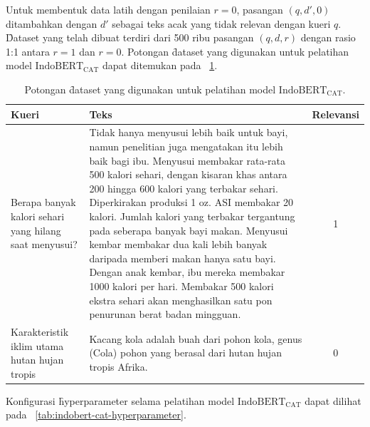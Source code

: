 Untuk membentuk data latih dengan penilaian $r=0$, pasangan $(q, d',0)$ ditambahkan dengan $d'$ sebagai teks acak yang tidak relevan dengan kueri $q$. \f{Dataset} yang telah dibuat terdiri dari 500 ribu pasangan $(q, d, r)$ dengan rasio 1:1 antara $r=1$ dan $r=0$. Potongan \f{dataset} yang digunakan untuk pelatihan model $\text{IndoBERT}_{\text{CAT}}$ dapat ditemukan pada \tab~\ref{tab:contoh-indobert-cat-data}.
\begin{table}[!ht]
    \centering
    \caption{Potongan \f{dataset} yang digunakan untuk pelatihan model $\text{IndoBERT}_{\text{CAT}}$.}
    \label{tab:contoh-indobert-cat-data}
    \begin{tabular}{|p{3cm}|p{10cm}|c|} \hline
        \textbf{Kueri}                                         & \textbf{Teks}                                                                                                                                                                                                                                                                                                                                                                                                                                                                                                                                                                                          & \textbf{Relevansi} \\ \hline
        Berapa banyak kalori sehari yang hilang saat menyusui? & Tidak hanya menyusui lebih baik untuk bayi, namun penelitian juga mengatakan itu lebih baik bagi ibu. Menyusui membakar rata-rata 500 kalori sehari, dengan kisaran khas antara 200 hingga 600 kalori yang terbakar sehari. Diperkirakan produksi 1 oz. ASI membakar 20 kalori. Jumlah kalori yang terbakar tergantung pada seberapa banyak bayi makan. Menyusui kembar membakar dua kali lebih banyak daripada memberi makan hanya satu bayi. Dengan anak kembar, ibu mereka membakar 1000 kalori per hari. Membakar 500 kalori ekstra sehari akan menghasilkan satu pon penurunan berat badan mingguan. & 1                  \\ \hline
        Karakteristik iklim utama hutan hujan tropis           & Kacang kola adalah buah dari pohon kola, genus (Cola) pohon yang berasal dari hutan hujan tropis Afrika. & 0                  \\ \hline
    \end{tabular}
\end{table}

Konfigurasi \f{hyperparameter} selama pelatihan model $\text{IndoBERT}_{\text{CAT}}$ dapat  dilihat pada \tab~\ref{tab:indobert-cat-hyperparameter}.

